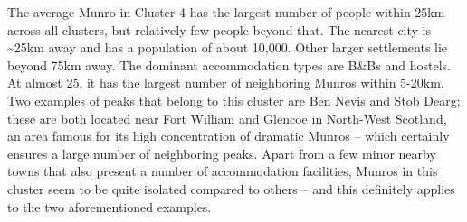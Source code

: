 \documentclass[11pt,a4paper]{article}
\begin{document}
The average Munro in Cluster 4 has the largest number of people within 25km across all clusters, but relatively few people beyond that. The nearest city is \textasciitilde 25km away and has a population of about 10,000. Other larger settlements lie beyond 75km away. The dominant accommodation types are B&Bs and hostels. At almost 25, it has the largest number of neighboring Munros within 5-20km. Two examples of peaks that belong to this cluster are Ben Nevis and Stob Dearg; these are both located near Fort William and Glencoe in North-West Scotland, an area famous for its high concentration of dramatic Munros – which certainly ensures a large number of neighboring peaks. Apart from a few minor nearby towns that also present a number of accommodation facilities, Munros in this cluster seem to be quite isolated compared to others – and this definitely applies to the two aforementioned examples.
\end{document}
